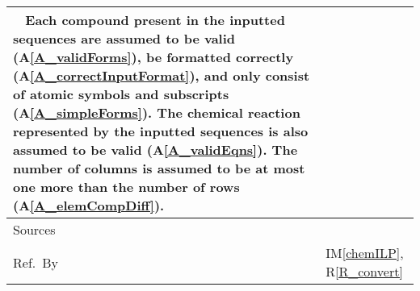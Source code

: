 \documentclass[12pt]{article}
\newcommand{\colAwidth}{0.13\textwidth}
\newcommand{\colBwidth}{0.82\textwidth}
\newcommand{\aref}[1]{A\ref{#1}}
\newcommand{\imref}[1]{IM\ref{#1}}
\newcommand{\rref}[1]{R\ref{#1}}
\begin{document}
\begin{minipage}{\textwidth}
\begin{tabular}{| p{\colAwidth} | p{\colBwidth}|}
    ~\newline
    Each compound present in the inputted sequences are
    assumed to be valid (\aref{A_validForms}), be formatted correctly
    (\aref{A_correctInputFormat}), and only consist of atomic symbols and
    subscripts (\aref{A_simpleForms}). The chemical reaction represented by the
    inputted sequences is also assumed to be valid (\aref{A_validEqns}). The
    number of columns is assumed to be
    at most one more than the number of rows (\aref{A_elemCompDiff}).  \\
    \hline
    Sources     & \cite{hamid_balancing_2019}                          \\
    \hline
    Ref.\ By    & \imref{chemILP}, \rref{R_convert}                    \\
    \hline
  \end{tabular}
\end{minipage}\\
\end{document}
